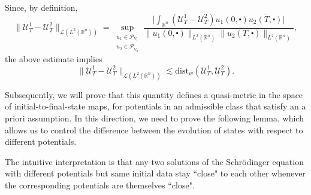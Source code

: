 \documentclass[10pt,a4paper]{amsart}
\theoremstyle{remark}
\theoremstyle{definition}
\newcommand{\R}{\mathbb{R}}
\newcommand{\dist}{\mathrm{dist}}
\def\lec{\lesssim}
\def\cal{\mathcal}
\def\ovl{\overline}
\def\cd{\centerdot}
\begin{document}
Since, by definition, 
\[ 
\|\cal{U}_T^1 - \cal{U}^2_T\|_{\cal{L}(L^2(\R^n))}=\sup_{\substack{u_1\in\mathcal P_{V_1}\\ u_2\in\mathcal P_{\ovl V_2}}} \frac{\Big| \displaystyle  \int_{\R^n} (\cal{U}_T^1-\cal{U}_T^2) u_1(0, \cd) \ovl{u_2(T, \cd)} \Big|}{\|u_1(0, \cd)\|_{L^2(\R^n)} \|u_2(T, \cd)\|_{L^2(\R^n)}},
\] 
the above estimate implies 
%
\begin{equation}\label{eq: bound_IF_map_distance}
	\|\cal{U}_T^1 - \cal{U}^2_T\|_{\cal{L}(L^2(\R^n))} \lec \dist_{w}(\cal{U}_T^1, \cal{U}_T^2). 
\end{equation}

Subsequently, we will prove that this quantity defines a quasi-metric in the space of initial-to-final-state maps, for potentials in an admissible class that satisfy an a priori assumption. 
%
In this direction, we need to prove the following lemma, which allows us to control the difference between the evolution of states with respect to different potentials.

The intuitive interpretation is that any two solutions of the Schr\"odinger equation with different potentials but same initial data stay ``close" to each other whenever the corresponding potentials are themselves ``close".
%



  
\end{document}
